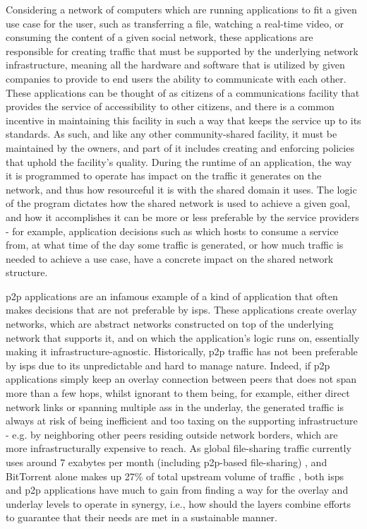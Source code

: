     Considering a network of computers which are running applications to fit a given use case for the user, such as transferring a file, watching a real-time video, or consuming the content of a given social network, these applications are responsible for creating traffic that must be supported by the underlying network infrastructure, meaning all the hardware and software that is utilized by given companies to provide to end users the ability to communicate with each other.
    These applications can be thought of as citizens of a communications facility that provides the service of accessibility to other citizens, and there is a common incentive in maintaining this facility in such a way that keeps the service up to its standards.
    As such, and like any other community-shared facility, it must be maintained by the owners, and part of it includes creating and enforcing policies that uphold the facility's quality.
    During the runtime of an application, the way it is programmed to operate has impact on the traffic it generates on the network, and thus how resourceful it is with the shared domain it uses.
    The logic of the program dictates how the shared network is used to achieve a given goal, and how it accomplishes it can be more or less preferable by the service providers - for example, application decisions such as which hosts to consume a service from, at what time of the day some traffic is generated, or how much traffic is needed to achieve a use case, have a concrete impact on the shared network structure.

    \gls{p2p} applications are an infamous example of a kind of application that often makes decisions that are not preferable by \glspl{isp}.
    These applications create overlay networks, which are abstract networks constructed on top of the underlying network that supports it, and on which the application's logic runs on, essentially making it infrastructure-agnostic.
    Historically, \gls{p2p} traffic has not been preferable by \glspl{isp} due to its unpredictable and hard to manage nature.
    Indeed, if \gls{p2p} applications simply keep an overlay connection between peers that does not span more than a few hops, whilst ignorant to them being, for example, either direct network links or spanning multiple \glspl{as} in the underlay, the generated traffic is always at risk of being inefficient and too taxing on the supporting infrastructure - e.g.  by neighboring other peers residing outside network borders, which are more infrastructurally expensive to reach.
    As global file-sharing traffic currently uses around 7 exabytes per month (including \gls{p2p}-based file-sharing) \cite{cisco2019}, and BitTorrent alone makes up 27\% of total upstream volume of traffic \cite{sandvine2019}, both \glspl{isp} and \gls{p2p} applications have much to gain from finding a way for the overlay and underlay levels to operate in synergy, i.e., how should the layers combine efforts to guarantee that their needs are met in a sustainable manner.

